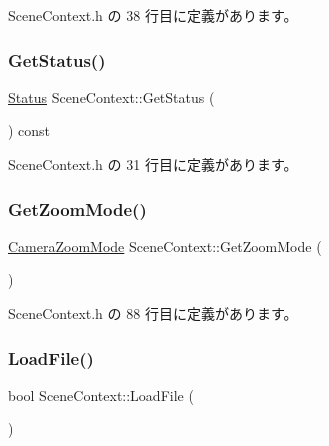  Scene\+Context.\+h の 38 行目に定義があります。

\mbox{\label{class_scene_context_af33ba9000594fd8bce536c99bb4aae4e}} 
\subsubsection{\texorpdfstring{Get\+Status()}{GetStatus()}}
{\footnotesize\ttfamily \hyperlink{class_scene_context_ad0fdb258c51900e90cc206ecdff267d1}{Status} Scene\+Context\+::\+Get\+Status (\begin{DoxyParamCaption}{ }\end{DoxyParamCaption}) const\hspace{0.3cm}{\ttfamily [inline]}}



 Scene\+Context.\+h の 31 行目に定義があります。

\mbox{\label{class_scene_context_ae0c21a6c4e0cbb7a6a531a1a5d1a9ec9}} 
\subsubsection{\texorpdfstring{Get\+Zoom\+Mode()}{GetZoomMode()}}
{\footnotesize\ttfamily \hyperlink{class_scene_context_a06de9da0c18152a74673a8ed829abf78}{Camera\+Zoom\+Mode} Scene\+Context\+::\+Get\+Zoom\+Mode (\begin{DoxyParamCaption}{ }\end{DoxyParamCaption})\hspace{0.3cm}{\ttfamily [inline]}}



 Scene\+Context.\+h の 88 行目に定義があります。

\mbox{\label{class_scene_context_ae0e2269a6a0df27ec32114282c52f812}} 
\subsubsection{\texorpdfstring{Load\+File()}{LoadFile()}}
{\footnotesize\ttfamily bool Scene\+Context\+::\+Load\+File (\begin{DoxyParamCaption}{ }\end{DoxyParamCaption})}



